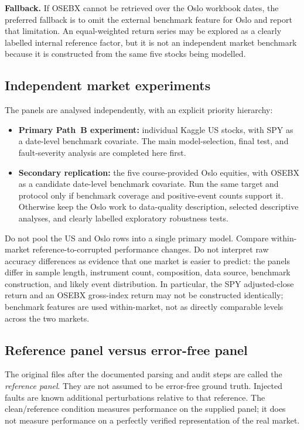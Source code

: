 \documentclass[11pt,a4paper]{article}
\begin{document}
\textbf{Fallback.} If OSEBX cannot be retrieved over the Oslo workbook dates, the preferred fallback is to omit the external benchmark feature for Oslo and report that limitation. An equal-weighted return series may be explored as a clearly labelled internal reference factor, but it is not an independent market benchmark because it is constructed from the same five stocks being modelled.

\subsection{Independent market experiments}

The panels are analysed independently, with an explicit priority hierarchy:
\begin{itemize}
  \item \textbf{Primary Path~B experiment:} individual Kaggle US stocks, with SPY as a date-level benchmark covariate. The main model-selection, final test, and fault-severity analysis are completed here first.
  \item \textbf{Secondary replication:} the five course-provided Oslo equities, with OSEBX as a candidate date-level benchmark covariate. Run the same target and protocol only if benchmark coverage and positive-event counts support it. Otherwise keep the Oslo work to data-quality description, selected descriptive analyses, and clearly labelled exploratory robustness tests.
\end{itemize}

Do not pool the US and Oslo rows into a single primary model. Compare within-market reference-to-corrupted performance changes. Do not interpret raw accuracy differences as evidence that one market is easier to predict: the panels differ in sample length, instrument count, composition, data source, benchmark construction, and likely event distribution. In particular, the SPY adjusted-close return and an OSEBX gross-index return may not be constructed identically; benchmark features are used within-market, not as directly comparable levels across the two markets.

\subsection{Reference panel versus error-free panel}

The original files after the documented parsing and audit steps are called the \emph{reference panel}. They are not assumed to be error-free ground truth. Injected faults are known additional perturbations relative to that reference. The clean/reference condition measures performance on the supplied panel; it does not measure performance on a perfectly verified representation of the real market.
\end{document}
